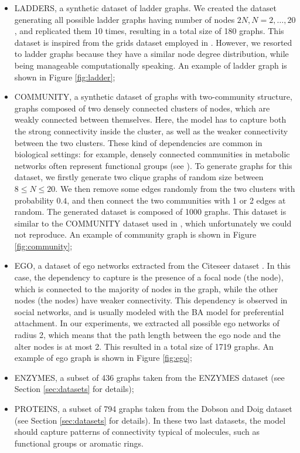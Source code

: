 \begin{itemize}
    \item LADDERS, a synthetic dataset of ladder graphs. We created the dataset generating all possible ladder graphs having number of nodes $2N, N = 2, \ldots, 20$, and replicated them 10 times, resulting in a total size of 180 graphs. This dataset is inspired from the grids dataset employed in \citep{you2018graphrnn}. However, we resorted to ladder graphs because they have a similar node degree distribution, while being manageable computationally speaking. An example of ladder graph is shown in Figure \ref{fig:ladder};
    \item COMMUNITY, a synthetic dataset of graphs with two-community structure, \ie graphs composed of two densely connected clusters of nodes, which are weakly connected between themselves. Here, the model has to capture both the strong connectivity inside the cluster, as well as the weaker connectivity between the two clusters. These kind of dependencies are common in biological settings: for example, densely connected communities in metabolic networks often represent functional groups (see \eg \citep{girvan2002commstructsocialbionet}). To generate graphs for this dataset, we firstly generate two clique graphs of random size between $8 \leq N \leq 20$. We then remove some edges randomly from the two clusters with probability $0.4$, and then connect the two communities with 1 or 2 edges at random. The generated dataset is composed of 1000 graphs. This dataset is similar to the COMMUNITY dataset used in \citep{you2018graphrnn}, which unfortunately we could not reproduce. An example of community graph is shown in Figure \ref{fig:community};
    \item EGO, a dataset of ego networks extracted from the Citeseer dataset \citep{giles1998citeseer}. In this case, the dependency to capture is the presence of a focal node (the  node), which is connected to the majority of nodes in the graph, while the other nodes (the  nodes) have weaker connectivity. This dependency is observed in social networks, and is usually modeled with the BA model for preferential attachment. In our experiments, we extracted all possible ego networks of radius 2, which means that the path length between the ego node and the alter nodes is at most 2. This resulted in a total size of 1719 graphs. An example of ego graph is shown in Figure \ref{fig:ego};
    \item ENZYMES, a subset of 436 graphs taken from the ENZYMES dataset \citep{schomburg2004enzymes} (see Section \ref{sec:datasets} for details);
    \item PROTEINS, a subset of 794 graphs taken from the Dobson and Doig dataset \citep{dobson2003dd} (see Section \ref{sec:datasets} for details). In these two last datasets, the model should capture patterns of connectivity typical of molecules, such as functional groups or aromatic rings.
\end{itemize}
